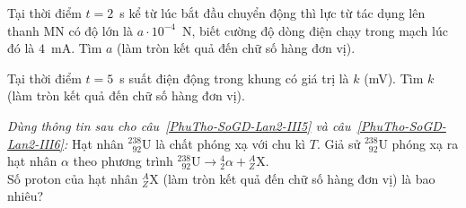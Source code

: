 \begin{ex}
\begin{center}
		\end{center}
		Tại thời điểm $t=2$~s kể từ lúc bắt đầu chuyển động thì lực từ tác dụng lên thanh MN có độ lớn là $a\cdot 10^{-4}$~N, biết cường độ dòng điện chạy trong mạch lúc đó là $4$~mA. Tìm $a$ (làm tròn kết quả đến chữ số hàng đơn vị).
		\par
	\end{ex}

	\begin{ex}%
		\label{PhuTho-SoGD-Lan2-III4}Tại thời điểm $t=5$~s suất điện động trong khung có giá trị là $k$ (mV). Tìm $k$ (làm tròn kết quả đến chữ số hàng đơn vị).
		\par
	\end{ex}

	\begin{ex}%
		\label{PhuTho-SoGD-Lan2-III5}\textit{Dùng thông tin sau cho câu~\ref{PhuTho-SoGD-Lan2-III5} và câu~\ref{PhuTho-SoGD-Lan2-III6}:} Hạt nhân $^{238}_{\phantom{2}92}\text{U}$ là chất phóng xạ với chu kì $T$. Giả sử $^{238}_{\phantom{2}92}\text{U}$ phóng xạ ra hạt nhân $\alpha$ theo phương trình $^{238}_{\phantom{2}92}\text{U}\to{}^4_2\alpha+{}^A_Z\text{X}$.\\
		Số proton của hạt nhân ${}^A_Z\text{X}$ (làm tròn kết quả đến chữ số hàng đơn vị) là bao nhiêu?
		\par
	\end{ex}


